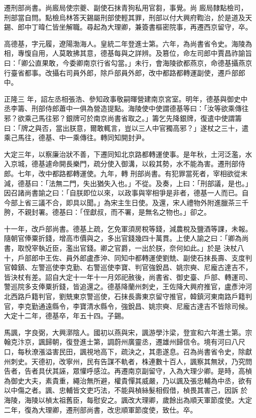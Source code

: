 \begin{pinyinscope}
 遷刑部尚書。尚廄局使宗夔、副使石抹青狗私用官芻，事覺。尚
 廄局隸點檢司，刑部當自問。點檢烏林答天錫屬刑部使輕其罪，刑部以付大興府鞫治，於是道及天錫、郎中丁暐仁皆坐解職。尋起為大理卿，兼簽書樞密院事，再遷西京留守，卒。



 高德基，字元履，遼陽渤海人。皇統二年登進士第。六年，為尚書省令史。海陵為相，專愎自用，人莫敢拂其意，德基每與之詳辨。及篡位，命左司郎中賈昌祚諭旨曰：「卿公直果敢，今委卿南京行省勾當。」未行，會海陵欲都燕京，命德基攝燕京行臺省都事。改攝右司員外郎，除戶部員外郎，改中都路都轉運副使，遷戶部郎中。



 正隆三
 年，詔左丞相張浩、參知政事敬嗣暉營建南京宮室。明年，德基與御史中丞李籌、刑部侍郎蕭中一俱為營造提點。海陵使中使謂德基等曰：「汝等欲乘傳往邪？欲乘己馬往邪？銀牌可於南京尚書省取之。」籌乞先降銀牌，復遣中使謂籌曰：「牌之與否，當出朕意，爾敢輒言，豈以三人中官獨高邪？」遂杖之三十，遣乘己馬往，德基、中一乘傳往。轉同知開封尹。



 大定三年，以察廉治狀不善，下遷同知北京路都轉運使事。是年秋，土河泛濫，水入京城，德基遽命開長樂門，疏分使入御溝，以殺其勢，水不能為害。遷刑部侍郎。七年，改中都路都轉運使。九年，轉
 刑部尚書。有犯罪當死者，宰相欲從末減，德基曰：「法無二門，失出猶失入也。」不從。及奏，上曰：「刑部議，是也。」因召諸尚書諭之曰：「自朕即位以來，以政事與宰相爭是非者，德基一人而已。自今部上省三議不合，即具以聞。」為宋主生日使。及還，宋人禮物外附進臘茶三千胯，不親封署。德基曰：「侄獻叔，而不署，是無名之物也。」卻之。



 十一年，改戶部尚書。德基上疏，乞免軍須房稅等錢，減農稅及鹽酒等課，未報。隨朝官俸粟折錢，增高市價與之，多出官錢幾四十萬貫。上使人諭之曰：「卿為尚書，取悅宰執近臣，濫出官錢。卿之官爵，一出於朕，奈何如此。」於是
 決杖八十，戶部郎中王佐、員外郎盧彥沖、同知中都轉運使劉兟、副使石抹長壽、支度判官韓鎮、左警巡使李克勤、右警巡使李寶、判官強銳昌、姚宗奭、尼龐古達吉不，皆決杖有差。詔自大定十一年十一月郊祀赦後，尚書省、御史臺、戶部、轉運司、警巡院多支俸粟折錢，皆追還之。德基降蘭州刺史，王佐降大興府推官，盧彥沖河北西路戶籍判官，劉兟東京警巡使，石抹長壽東京留守推官，韓鎮河東南路戶籍判官，李克勤通遠縣令，李寶清水縣令，強銳昌、姚宗奭、尼龐古達吉不皆除司候。大定十二年，德基卒，年五十四。子錫。



 馬諷，字良弼，大興漷陰人。國初以燕與宋，諷游學汴梁，登宣和六年進士第。宗翰克汴京，諷歸朝，復登進士第，調蔚州廣靈丞，遷雄州歸信令。境有河曰八尺口，每秋潦漲溢害民田，諷視地高下，疏決之，其患遂息。召為尚書省令史，除獻州刺史。天德初，改寧州，民有告謀不軌者，株連數十百人，諷察其無狀，乃究問告者，告者具伏其誣，眾懽呼感泣。再遷南京副留守，入為大理少卿。是時，高楨為御史大夫，素貴重，繩治無所避，權貴憚其威嚴，乃以諷及張忠輔為中丞，欲有以中傷之者。諷、忠輔皆文吏巧法，不能與楨絲髮相假借，楨畏其害己，因訴
 於海陵，海陵以楨太祖舊臣，每慰安之。諷改大理卿，歲餘出為順天軍節度使。大定二年，復為大理卿，遷刑部尚書，改忠順軍節度使，致仕。卒。




\end{pinyinscope}
